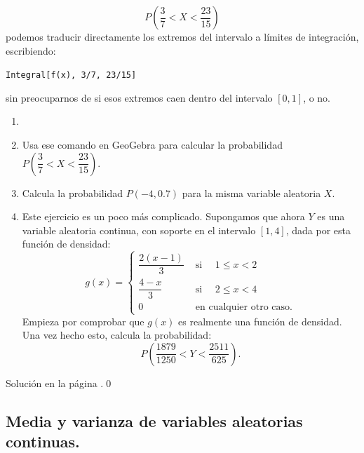 \documentclass[10pt,a4paper]{article}\usepackage[]{graphicx}\usepackage[]{color}
\newcounter{cont01}
\begin{document}
\[P\left( \dfrac{3}{7} < X < \dfrac{23}{15}\right)\]
podemos traducir directamente los extremos del intervalo a límites de integración, escribiendo:
   \begin{center}
    \verb#Integral[f(x), 3/7, 23/15]#
   \end{center}
sin preocuparnos de si esos extremos caen dentro del intervalo $[0, 1]$, o no.

\begin{ejercicio}
\label{tut05:ejercicio14}
\begin{enumerate}
  \item[]
  \item Usa ese comando en GeoGebra para calcular la probabilidad $P\left( \dfrac{3}{7} < X < \dfrac{23}{15}\right)$.
  \item Calcula la probabilidad $P(-4, 0.7)$ para la misma variable aleatoria $X$.
  \item Este ejercicio es un poco más complicado.  Supongamos que ahora $Y$ es una variable aleatoria continua, con soporte en el intervalo $[1,4]$, dada por esta función de densidad:
      \[
      g(x) = \begin{cases}
      \dfrac{2(x-1)}{3}& \mbox{ si }\quad 1\leq x < 2\\[3mm]
      \dfrac{4-x}{3}& \mbox{ si }\quad 2\leq x < 4\\[3mm]
      0&\mbox{ en cualquier otro caso.}
      \end{cases}
      \]
      Empieza por comprobar que $g(x)$ es realmente una función de densidad. Una vez hecho esto, calcula la probabilidad:
      \[P\left(\dfrac{1879}{1250} < Y < \dfrac{2511}{625}\right).\]
\end{enumerate}
Solución en la página \pageref{tut05:ejercicio14:sol}.\qed
\end{ejercicio}


\subsection{Media y varianza de variables aleatorias continuas.}
\label{tut05:subsec:MediaVarianzaVariablesAleatoriasContinuas}
\end{document}
